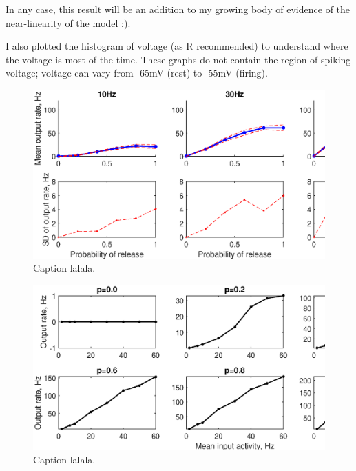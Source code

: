 \documentclass[a4paper,12pt]{report}
\theoremstyle{definition}
\begin{document}
In any case, this result will be an addition to my growing body of evidence of the near-linearity of the model :).

I also plotted the histogram of voltage (as R recommended) to understand where the voltage is most of the time. These graphs do not contain the region of spiking voltage; voltage can vary from -65mV (rest) to -55mV (firing).


\begin{figure}[h]
    \includegraphics[width=\textwidth]{figures/exp7_PRoutputvariance_grid.eps}
    \caption{Caption lalala.}
    \label{fig:exp7grid}
\end{figure}

\begin{figure}[h]
    \includegraphics[width=\textwidth]{figures/exp8_gridoutputs_epsp05.eps}
    \caption{Caption lalala.}
    \label{fig:exp8gridoutputs}
\end{figure}
\end{document}
